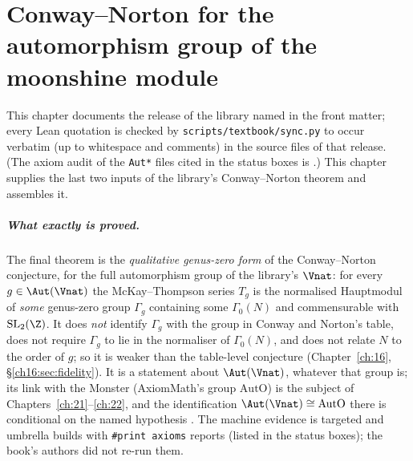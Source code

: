 \chapter{Conway--Norton for the automorphism group of the moonshine module}\label{ch:20}

\providecommand{\chtwentylean}[1]{\texttt{\directlua{ local s = "\luaescapestring{\detokenize{#1}}" local first = true for c in s:gmatch(utf8.charpattern) do if (not first) and c:match("^[A-Z]$") then tex.sprint("\string\\allowbreak{}") end tex.sprint(-2, c) if c == "_" or c == "." then tex.sprint("\string\\allowbreak{}") end first = false end}}}
\providecommand{\chtwentyfile}[1]{\texttt{\directlua{ local s = "\luaescapestring{\detokenize{#1}}" local first = true for c in s:gmatch(utf8.charpattern) do if (not first) and c:match("^[A-Z]$") then tex.sprint("\string\\allowbreak{}") end tex.sprint(-2, c) first = false end}}}
\providecommand{\chtwentyVL}{V_\Leech^{+}}
\providecommand{\chtwentyTp}{T^{+}}
\providecommand{\chtwentyvac}{\mathbf 1}
\providecommand{\chtwentym}{\mathfrak m}
\providecommand{\chtwentyg}{\mathfrak g}
\providecommand{\chtwentyLf}{\Leech_4}
\begingroup\setlength{\emergencystretch}{3em}\sloppy

This chapter documents the release of the library named in the front matter; every Lean quotation is checked by
\texttt{scripts/textbook/sync.py} to occur verbatim (up to whitespace and comments) in the source files of that
release.  (The axiom audit of the \texttt{Aut*} files cited in the status boxes is
.)  This chapter supplies the last two inputs of the library's
Conway--Norton theorem and assembles it.

\paragraph{What exactly is proved.}  The final theorem is the \emph{qualitative genus-zero form} of the Conway--Norton
conjecture, for the full automorphism group of the library's $\Vnat$: for every $g\in\Aut(\Vnat)$ the McKay--Thompson
series $T_g$ is the normalised Hauptmodul of \emph{some} genus-zero group $\Gamma_g$ containing some $\Gamma_0(N)$ and
commensurable with $\mathrm{SL}_2(\Z)$.  It does \emph{not} identify $\Gamma_g$ with the group in Conway and Norton's
table, does not require $\Gamma_g$ to lie in the normaliser of $\Gamma_0(N)$, and does not relate $N$ to the order of $g$;
so it is weaker than the table-level conjecture (Chapter~\ref{ch:16}, \S\ref{ch16:sec:fidelity}).  It is a statement about
$\Aut(\Vnat)$, whatever that group is; its link with the Monster (AxiomMath's group $\mathrm{AutO}$) is the subject of
Chapters~\ref{ch:21}--\ref{ch:22}, and the identification $\Aut(\Vnat)\cong\mathrm{AutO}$ there is conditional on the
named hypothesis .  The machine evidence is targeted and umbrella builds with \texttt{\#print axioms}
reports (listed in the status boxes); the book's authors did not re-run them.

